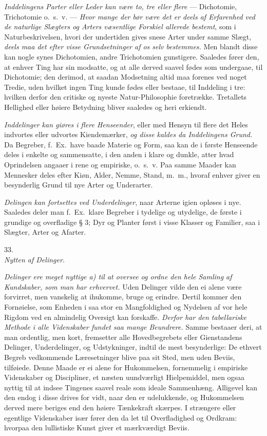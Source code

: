 \documentclass[12pt,a4paper]{article}
\newcommand{\logsec}[2]{%
  \bigskip\begin{center}{\large #1}\\[4pt]{\emph{#2}}\end{center}\smallskip}
\newcommand{\opage}[1]{\marginnote{\footnotesize\textit{[#1]}}}
\begin{document}
\emph{Inddelingens Parter eller Leder kan være to, tre eller flere} ---
Dichotomie, Trichotomie o.~s.~v.
\opage{101} --- \emph{Hvor mange der bør være det er deels af Erfarenhed ved de naturlige
Slægters og Arters væsentlige Forskiel allerede bestemt}, som i
Naturbeskrivelsen, hvori der undertiden gives snese Arter under samme Slægt,
\emph{deels maa det efter visse Grundsetninger af os selv bestemmes.} Men
blandt disse kan nogle synes Dichotomien, andre Trichotomien gunstigere.
Saaledes fører den, at enhver Ting har sin modsatte, og at alle derved saavel
fødes som undergaae, til Dichotomie; den derimod, at saadan Modsetning altid
maa forenes ved noget Tredie, uden hvilket ingen Ting kunde fødes eller
bestaae, til Inddeling i tre: hvilken derfor den critiske og nyeste
Natur-Philosophie foretrække. Tretallets Hellighed eller høiere Betydning
bliver saaledes og heri erkiendt.

\emph{Inddelinger kan giøres i flere Henseender}, eller med Hensyn til flere det
Heles indvortes eller udvortes Kiendemærker, \emph{og disse kaldes da
Inddelingens Grund.} Da Begreber, f.~Ex.\ have baade Materie og Form, saa kan de
i første Henseende deles i enkelte og sammensatte, i den anden i klare og
dunkle, atter hvad Oprindelsen angaaer i rene og empiriske, o.~s.~v. Paa samme
Maader kan Mennesker deles efter Kiøn, Alder, Nemme, Stand, m.~m., hvoraf enhver
giver en besynderlig Grund til nye Arter og Underarter.

\emph{Delingen kan fortsettes ved Underdelinger}, naar Arterne igien opløses i
nye. Saaledes deler man f.~Ex.\ klare Begreber i tydelige og utydelige, de første
\opage{102} i grundige og overfladige § 3; Dyr og Planter først i visse Klasser og
Familier, saa i Slægter, Arter og Afarter.

\logsec{33.}{Nytten af Delinger.}

\noindent
\emph{Delinger ere meget nyttige a) til at oversee og ordne den hele Samling af
Kundskaber, som man har erhvervet.} Uden Delinger vilde den ei alene være
forvirret, men vanskelig at ihukomme, bruge og erindre. Dertil kommer den
Fornøielse, som Enheden i saa stor en Mangfoldighed og Nydelsen af vor hele
Rigdom ved en almindelig Oversigt kan forskaffe. \emph{Derfor har den
tabellariske Methode i alle Videnskaber fundet saa mange Beundrere.} Samme
bestaaer deri, at man ordentlig, men kort, fremsetter alle Hovedbegrebets eller
Gienstandens Delinger, Underdelinger, og Udstykninger, indtil de mest
besynderlige: De ethvert Begreb vedkommende Læresetninger blive paa sit Sted,
men uden Beviis, tilføiede. Denne Maade er ei alene for Hukommelsen, fornemmelig
i empiriske Videnskaber og Discipliner, et næsten uundværligt Hielpemiddel, men
ogsaa nyttig til at indsee Tingenes saavel reale som ideale Sammenhæng.
Alligevel kan den endog i disse drives for vidt, naar den er udelukkende, og
Hukommelsen derved mere beriges end den høiere Tænkekraft skærpes. I strængere
eller egentlige
\opage{103} Videnskaber især fører den da let til Overfladighed og Ordkram: hvorpaa den
lullistiske Kunst giver et mærkværdigt Beviis.
\end{document}
